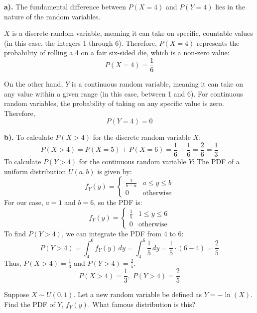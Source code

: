 \documentclass[a4paper, 10pt]{article}
\begin{document}
\begin{solution}
	\textbf{a).} The fundamental difference between \( P(X = 4) \) and \( P(Y = 4) \) lies in the nature of the random variables.

	\vspace{2mm}

	\( X \) is a discrete random variable, meaning it can take on specific, countable values (in this case, the integers 1 through 6).
	Therefore, \( P(X = 4) \) represents the probability of rolling a 4 on a fair six-sided die, which is a non-zero value:
	\[ P(X = 4) = \frac{1}{6} \]

	\vspace{2mm}

	On the other hand, \( Y \) is a continuous random variable, meaning it can take on any value within a given range (in this case, between 1 and 6).
	For continuous random variables, the probability of taking on any specific value is zero. Therefore,
	\[ P(Y = 4) = 0 \]

	\textbf{b).} To calculate \( P(X > 4) \) for the discrete random variable \( X \):
	\[ P(X > 4) = P(X = 5) + P(X = 6) = \frac{1}{6} + \frac{1}{6} = \frac{2}{6} = \frac{1}{3} \]
	To calculate \( P(Y > 4) \) for the continuous random variable \( Y \):
	The PDF of a uniform distribution \( U(a, b) \) is given by:
	\[ f_Y(y) = \begin{cases}
			\frac{1}{b-a} & a \leq y \leq b  \\
			0             & \text{otherwise}
		\end{cases} \]
	For our case, \( a = 1 \) and \( b = 6 \), so the PDF is:
	\[ f_Y(y) = \begin{cases}
			\frac{1}{5} & 1 \leq y \leq 6  \\
			0           & \text{otherwise}
		\end{cases} \]
	To find \( P(Y > 4) \), we can integrate the PDF from 4 to 6:
	\[ P(Y > 4) = \int_{4}^{6} f_Y(y) \, dy = \int_{4}^{6} \frac{1}{5} \, dy = \frac{1}{5} \cdot (6 - 4) = \frac{2}{5} \]
	Thus, \( P(X > 4) = \frac{1}{3} \) and \( P(Y > 4) = \frac{2}{5} \).
	\[\boxed{P(X > 4) = \frac{1}{3}, \; P(Y > 4) = \frac{2}{5}}\]
\end{solution}

\newpage

\begin{problem}
Suppose \( X \sim U(0, 1) \). Let a new random variable be defined as \( Y = -\ln(X) \).
Find the PDF of \( Y \), \( f_Y(y) \). What famous distribution is this?
\end{problem}
\end{document}
